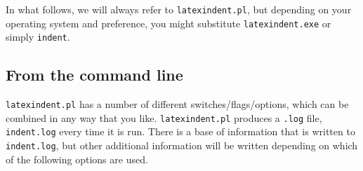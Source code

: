 In what follows, we will always refer to \lstinline!latexindent.pl!, but depending on 
your operating system and preference, you might substitute \lstinline!latexindent.exe! or
simply \lstinline!indent!.
     
\subsection{From the command line}\label{sec:commandline}
\lstinline!latexindent.pl! has a number of different switches/flags/options, which 
can be combined in any way that you like. \lstinline!latexindent.pl! 
produces a \lstinline!.log! file, \lstinline!indent.log! every time it
is run. There is a base of information that is written to \lstinline!indent.log!,
but other additional information will be written depending 
on which of the following options are used.
 	 	 	 	 	
